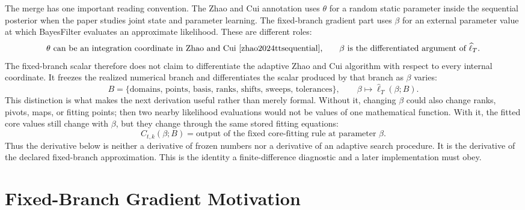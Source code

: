 \documentclass[11pt]{article}
\numberwithin{equation}{section}
\begin{document}
The merge has one important reading convention.  The Zhao and Cui \cite{zhao2024ttsequential} annotation uses
\(\theta\) for a random static parameter inside the sequential posterior when
the paper studies joint state and parameter learning.  The fixed-branch
gradient part uses \(\beta\) for an external parameter value at which
BayesFilter evaluates an approximate likelihood.  These are different roles:
\begin{equation}
    \theta \text{ can be an integration coordinate in Zhao and Cui \cite{zhao2024ttsequential},}
    \qquad
    \beta \text{ is the differentiated argument of } \widehat\ell_T .
    \label{eq:p24-p20-b1}
\end{equation}
The fixed-branch scalar therefore does not claim to differentiate the adaptive
Zhao and Cui \cite{zhao2024ttsequential} algorithm with respect to every internal coordinate.  It freezes the
realized numerical branch and differentiates the scalar produced by that
branch as \(\beta\) varies:
\begin{equation}
    B=\{\text{domains, points, basis, ranks, shifts, sweeps, tolerances}\},
    \qquad
    \beta\mapsto \widehat\ell_T(\beta;B).
    \label{eq:p24-p20-b2}
\end{equation}
This distinction is what makes the next derivation useful rather than merely
formal.  Without it, changing \(\beta\) could also change ranks, pivots, maps,
or fitting points; then two nearby likelihood evaluations would not be values
of one mathematical function.  With it, the fitted core values still change
with \(\beta\), but they change through the same stored fitting equations:
\begin{equation}
    C_{t,k}(\beta;B)
    =
    \text{output of the fixed core-fitting rule at parameter }\beta.
    \label{eq:p24-p20-b3}
\end{equation}
Thus the derivative below is neither a derivative of frozen numbers nor a
derivative of an adaptive search procedure.  It is the derivative of the
declared fixed-branch approximation.  This is the identity a finite-difference
diagnostic and a later implementation must obey.

\section{Fixed-Branch Gradient Motivation}
\end{document}
